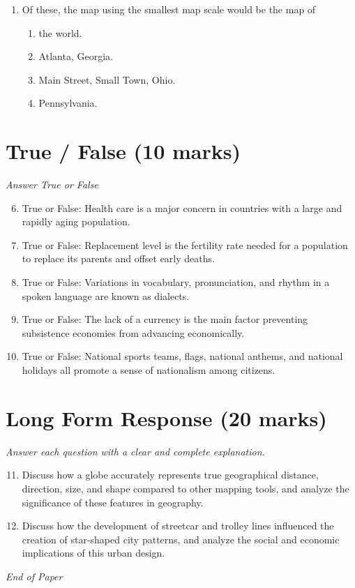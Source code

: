 \documentclass[12pt]{article}
\begin{document}
\begin{enumerate}[label=\arabic*.]
\begin{enumerate}[label=(\alph*)]
    \item A national holiday
    \item An attack by another country
    \item A charismatic national leader
\end{enumerate}
\item Of these, the map using the smallest map scale would be the map of
\begin{enumerate}[label=(\alph*)]
    \item the world.
    \item Atlanta, Georgia.
    \item Main Street, Small Town, Ohio.
    \item Pennsylvania.
\end{enumerate}
\end{enumerate}

\section*{True / False (10 marks)}
\textit{Answer True or False}
\begin{enumerate}[label=\arabic*.]
\setcounter{enumi}{5}
\item True or False: Health care is a major concern in countries with a large and rapidly aging population.
\item True or False: Replacement level is the fertility rate needed for a population to replace its parents and offset early deaths.
\item True or False: Variations in vocabulary, pronunciation, and rhythm in a spoken language are known as dialects.
\item True or False: The lack of a currency is the main factor preventing subsistence economies from advancing economically.
\item True or False: National sports teams, flags, national anthems, and national holidays all promote a sense of nationalism among citizens.
\end{enumerate}

\section*{Long Form Response (20 marks)}
\textit{Answer each question with a clear and complete explanation.}
\begin{enumerate}[label=\arabic*.]
\setcounter{enumi}{10}
\item Discuss how a globe accurately represents true geographical distance, direction, size, and shape compared to other mapping tools, and analyze the significance of these features in geography.
\item Discuss how the development of streetcar and trolley lines influenced the creation of star-shaped city patterns, and analyze the social and economic implications of this urban design.
\end{enumerate}

\vfill
\noindent\textit{End of Paper}
\end{document}
